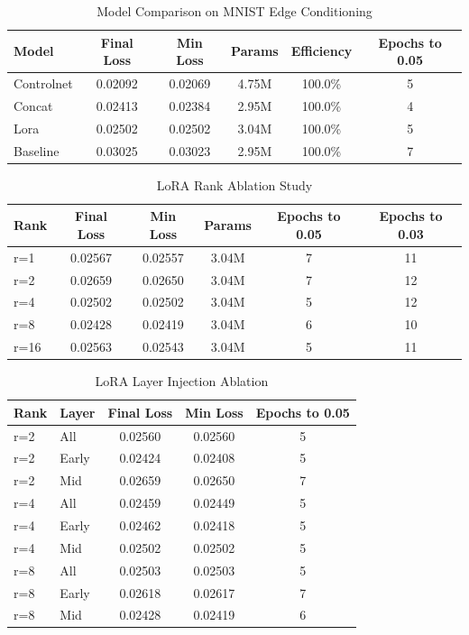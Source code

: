\begin{table}[h]
\centering
\caption{Model Comparison on MNIST Edge Conditioning}
\begin{tabular}{lccccc}
\hline
Model & Final Loss & Min Loss & Params & Efficiency & Epochs to 0.05 \\
\hline
Controlnet & 0.02092 & 0.02069 & 4.75M & 100.0\% & 5 \\
Concat & 0.02413 & 0.02384 & 2.95M & 100.0\% & 4 \\
Lora & 0.02502 & 0.02502 & 3.04M & 100.0\% & 5 \\
Baseline & 0.03025 & 0.03023 & 2.95M & 100.0\% & 7 \\
\hline
\end{tabular}
\end{table}

\begin{table}[h]
\centering
\caption{LoRA Rank Ablation Study}
\begin{tabular}{lccccc}
\hline
Rank & Final Loss & Min Loss & Params & Epochs to 0.05 & Epochs to 0.03 \\
\hline
r=1 & 0.02567 & 0.02557 & 3.04M & 7 & 11 \\
r=2 & 0.02659 & 0.02650 & 3.04M & 7 & 12 \\
r=4 & 0.02502 & 0.02502 & 3.04M & 5 & 12 \\
r=8 & 0.02428 & 0.02419 & 3.04M & 6 & 10 \\
r=16 & 0.02563 & 0.02543 & 3.04M & 5 & 11 \\
\hline
\end{tabular}
\end{table}

\begin{table}[h]
\centering
\caption{LoRA Layer Injection Ablation}
\begin{tabular}{llccc}
\hline
Rank & Layer & Final Loss & Min Loss & Epochs to 0.05 \\
\hline
r=2 & All & 0.02560 & 0.02560 & 5 \\
r=2 & Early & 0.02424 & 0.02408 & 5 \\
r=2 & Mid & 0.02659 & 0.02650 & 7 \\
r=4 & All & 0.02459 & 0.02449 & 5 \\
r=4 & Early & 0.02462 & 0.02418 & 5 \\
r=4 & Mid & 0.02502 & 0.02502 & 5 \\
r=8 & All & 0.02503 & 0.02503 & 5 \\
r=8 & Early & 0.02618 & 0.02617 & 7 \\
r=8 & Mid & 0.02428 & 0.02419 & 6 \\
\hline
\end{tabular}
\end{table}
